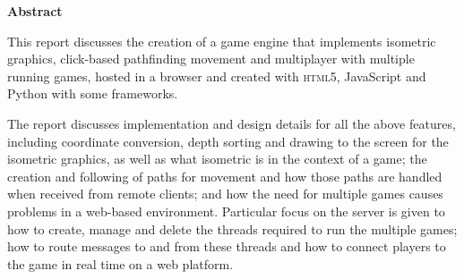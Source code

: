 \thispagestyle{empty}

\begin{center}
    {\LARGE\bf Abstract}
\end{center}


This report discusses the creation of a game engine that implements isometric graphics, click-based pathfinding movement and multiplayer with multiple running games, hosted in a browser and created with \textsc{html5}, JavaScript and Python with some frameworks.

The report discusses implementation and design details for all the above features, including coordinate conversion, depth sorting and drawing to the screen for the isometric graphics, as well as what isometric is in the context of a game; the creation and following of paths for movement and how those paths are handled when received from remote clients; and how the need for multiple games causes problems in a web-based environment. Particular focus on the server is given to how to create, manage and delete the threads required to run the multiple games; how to route messages to and from these threads and how to connect players to the game in real time on a web platform.